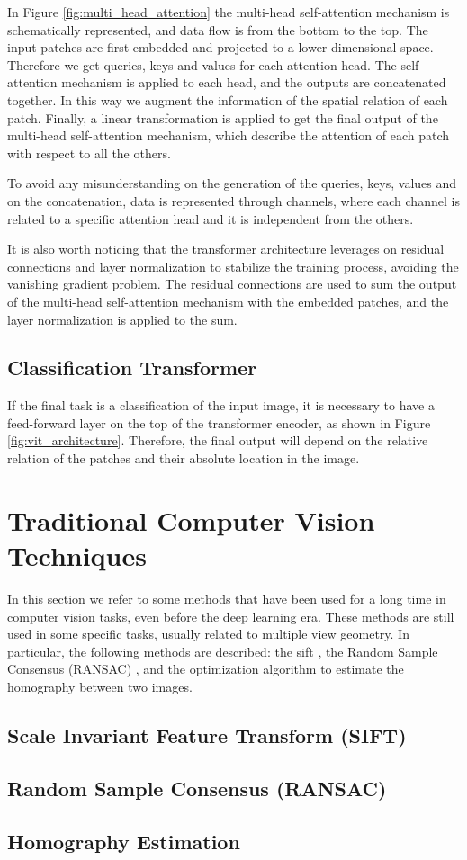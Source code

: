 In Figure \ref{fig:multi_head_attention} the multi-head self-attention mechanism 
is schematically represented, and data flow is from the bottom to the top. 
The input patches are first embedded and projected to a lower-dimensional space. 
Therefore we get queries, keys and values for each attention head. 
The self-attention mechanism is applied to each head, and the outputs are 
concatenated together. In this way we augment the information of the spatial 
relation of each patch. Finally, a linear transformation is applied to get 
the final output of the multi-head self-attention mechanism, which describe the 
attention of each patch with respect to all the others.

To avoid any misunderstanding on the generation of the queries, keys, values and 
on the concatenation, data is represented through channels, where each channel is 
related to a specific attention head and it is independent from the others.

It is also worth noticing that the transformer architecture leverages on residual 
connections and layer normalization to stabilize the training process, avoiding 
the vanishing gradient problem. The residual connections are used to sum the 
output of the multi-head self-attention mechanism with the embedded patches, 
and the layer normalization is applied to the sum.

\subsection{Classification Transformer}
If the final task is a classification of the input image, it is necessary 
to have a feed-forward layer on the top of the transformer encoder, as shown in 
Figure \ref{fig:vit_architecture}.
Therefore, the final output will depend on the relative relation of the patches 
and their absolute location in the image.


\section{Traditional Computer Vision Techniques}
In this section we refer to some methods that have been used for a long time 
in computer vision tasks, even before the deep learning era. These methods 
are still used in some specific tasks, usually related to multiple view geometry.
In particular, the following methods are described: the \ac{sift} \cite{lowe_sift}, 
the Random Sample Consensus (RANSAC) \cite{ransac}, and the optimization 
algorithm to estimate the homography between two images.

\subsection{Scale Invariant Feature Transform (SIFT)}

\subsection{Random Sample Consensus (RANSAC)}

\subsection{Homography Estimation}
